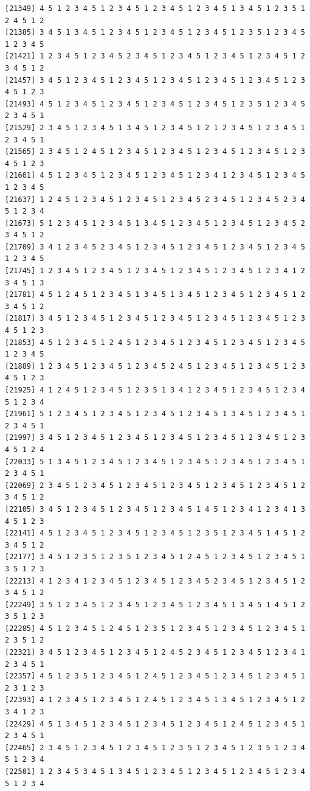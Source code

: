 \documentclass[
  11pt,
]{book}
\begin{document}
\begin{verbatim}
[21349] 4 5 1 2 3 4 5 1 2 3 4 5 1 2 3 4 5 1 2 3 4 5 1 3 4 5 1 2 3 5 1 2 4 5 1 2
[21385] 3 4 5 1 3 4 5 1 2 3 4 5 1 2 3 4 5 1 2 3 4 5 1 2 3 5 1 2 3 4 5 1 2 3 4 5
[21421] 1 2 3 4 5 1 2 3 4 5 2 3 4 5 1 2 3 4 5 1 2 3 4 5 1 2 3 4 5 1 2 3 4 5 1 2
[21457] 3 4 5 1 2 3 4 5 1 2 3 4 5 1 2 3 4 5 1 2 3 4 5 1 2 3 4 5 1 2 3 4 5 1 2 3
[21493] 4 5 1 2 3 4 5 1 2 3 4 5 1 2 3 4 5 1 2 3 4 5 1 2 3 5 1 2 3 4 5 2 3 4 5 1
[21529] 2 3 4 5 1 2 3 4 5 1 3 4 5 1 2 3 4 5 1 2 1 2 3 4 5 1 2 3 4 5 1 2 3 4 5 1
[21565] 2 3 4 5 1 2 4 5 1 2 3 4 5 1 2 3 4 5 1 2 3 4 5 1 2 3 4 5 1 2 3 4 5 1 2 3
[21601] 4 5 1 2 3 4 5 1 2 3 4 5 1 2 3 4 5 1 2 3 4 1 2 3 4 5 1 2 3 4 5 1 2 3 4 5
[21637] 1 2 4 5 1 2 3 4 5 1 2 3 4 5 1 2 3 4 5 2 3 4 5 1 2 3 4 5 2 3 4 5 1 2 3 4
[21673] 5 1 2 3 4 5 1 2 3 4 5 1 3 4 5 1 2 3 4 5 1 2 3 4 5 1 2 3 4 5 2 3 4 5 1 2
[21709] 3 4 1 2 3 4 5 2 3 4 5 1 2 3 4 5 1 2 3 4 5 1 2 3 4 5 1 2 3 4 5 1 2 3 4 5
[21745] 1 2 3 4 5 1 2 3 4 5 1 2 3 4 5 1 2 3 4 5 1 2 3 4 5 1 2 3 4 1 2 3 4 5 1 3
[21781] 4 5 1 2 4 5 1 2 3 4 5 1 3 4 5 1 3 4 5 1 2 3 4 5 1 2 3 4 5 1 2 3 4 5 1 2
[21817] 3 4 5 1 2 3 4 5 1 2 3 4 5 1 2 3 4 5 1 2 3 4 5 1 2 3 4 5 1 2 3 4 5 1 2 3
[21853] 4 5 1 2 3 4 5 1 2 4 5 1 2 3 4 5 1 2 3 4 5 1 2 3 4 5 1 2 3 4 5 1 2 3 4 5
[21889] 1 2 3 4 5 1 2 3 4 5 1 2 3 4 5 2 4 5 1 2 3 4 5 1 2 3 4 5 1 2 3 4 5 1 2 3
[21925] 4 1 2 4 5 1 2 3 4 5 1 2 3 5 1 3 4 1 2 3 4 5 1 2 3 4 5 1 2 3 4 5 1 2 3 4
[21961] 5 1 2 3 4 5 1 2 3 4 5 1 2 3 4 5 1 2 3 4 5 1 3 4 5 1 2 3 4 5 1 2 3 4 5 1
[21997] 3 4 5 1 2 3 4 5 1 2 3 4 5 1 2 3 4 5 1 2 3 4 5 1 2 3 4 5 1 2 3 4 5 1 2 4
[22033] 5 1 3 4 5 1 2 3 4 5 1 2 3 4 5 1 2 3 4 5 1 2 3 4 5 1 2 3 4 5 1 2 3 4 5 1
[22069] 2 3 4 5 1 2 3 4 5 1 2 3 4 5 1 2 3 4 5 1 2 3 4 5 1 2 3 4 5 1 2 3 4 5 1 2
[22105] 3 4 5 1 2 3 4 5 1 2 3 4 5 1 2 3 4 5 1 4 5 1 2 3 4 1 2 3 4 1 3 4 5 1 2 3
[22141] 4 5 1 2 3 4 5 1 2 3 4 5 1 2 3 4 5 1 2 3 5 1 2 3 4 5 1 4 5 1 2 3 4 5 1 2
[22177] 3 4 5 1 2 3 5 1 2 3 5 1 2 3 4 5 1 2 4 5 1 2 3 4 5 1 2 3 4 5 1 3 5 1 2 3
[22213] 4 1 2 3 4 1 2 3 4 5 1 2 3 4 5 1 2 3 4 5 2 3 4 5 1 2 3 4 5 1 2 3 4 5 1 2
[22249] 3 5 1 2 3 4 5 1 2 3 4 5 1 2 3 4 5 1 2 3 4 5 1 3 4 5 1 4 5 1 2 3 5 1 2 3
[22285] 4 5 1 2 3 4 5 1 2 4 5 1 2 3 5 1 2 3 4 5 1 2 3 4 5 1 2 3 4 5 1 2 3 5 1 2
[22321] 3 4 5 1 2 3 4 5 1 2 3 4 5 1 2 4 5 2 3 4 5 1 2 3 4 5 1 2 3 4 1 2 3 4 5 1
[22357] 4 5 1 2 3 5 1 2 3 4 5 1 2 4 5 1 2 3 4 5 1 2 3 4 5 1 2 3 4 5 1 2 3 1 2 3
[22393] 4 1 2 3 4 5 1 2 3 4 5 1 2 4 5 1 2 3 4 5 1 3 4 5 1 2 3 4 5 1 2 3 4 1 2 3
[22429] 4 5 1 3 4 5 1 2 3 4 5 1 2 3 4 5 1 2 3 4 5 1 2 4 5 1 2 3 4 5 1 2 3 4 5 1
[22465] 2 3 4 5 1 2 3 4 5 1 2 3 4 5 1 2 3 5 1 2 3 4 5 1 2 3 5 1 2 3 4 5 1 2 3 4
[22501] 1 2 3 4 5 3 4 5 1 3 4 5 1 2 3 4 5 1 2 3 4 5 1 2 3 4 5 1 2 3 4 5 1 2 3 4

\end{verbatim}
\end{document}
